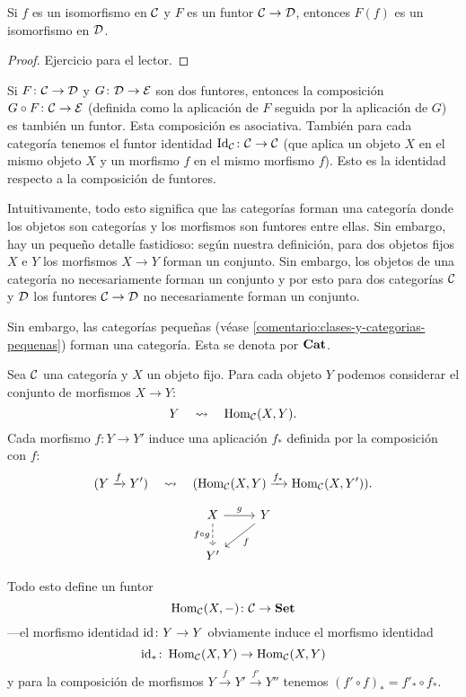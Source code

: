 \documentclass{article}
\numberwithin{equation}{section}
\theoremstyle{definition}
\begin{document}
\begin{observacion}
  Si $f$ es un isomorfismo en $\mathcal{C}$ y $F$ es un funtor
  $\mathcal{C}\to \mathcal{D}$, entonces $F (f)$ es un isomorfismo en
  $\mathcal{D}$.

  \begin{proof}
    Ejercicio para el lector.
  \end{proof}
\end{observacion}

\begin{observacion}
  Si $F\colon \mathcal{C}\to\mathcal{D}$ y $G\colon \mathcal{D}\to\mathcal{E}$ son
  dos funtores, entonces la composición
  $G\circ F\colon \mathcal{C} \to \mathcal{E}$ (definida como la aplicación de $F$
  seguida por la aplicación de $G$) es también un funtor. Esta composición es
  asociativa. También para cada categoría tenemos el funtor identidad
  $\operatorname{Id}_\mathcal{C}\colon \mathcal{C} \to \mathcal{C}$ (que aplica un objeto $X$ en
  el mismo objeto $X$ y un morfismo $f$ en el mismo morfismo $f$). Esto es la
  identidad respecto a la composición de funtores.
\end{observacion}

\begin{comentario}
  Intuitivamente, todo esto significa que las categorías forman una categoría
  donde los objetos son categorías y los morfismos son funtores entre ellas. Sin
  embargo, hay un pequeño detalle fastidioso: según nuestra definición, para dos
  objetos fijos $X$ e $Y$ los morfismos $X\to Y$ forman un conjunto. Sin
  embargo, los objetos de una categoría no necesariamente forman un conjunto y
  por esto para dos categorías $\mathcal{C}$ y $\mathcal{D}$ los funtores
  $\mathcal{C}\to\mathcal{D}$ no necesariamente forman un conjunto.

  Sin embargo, las categorías pequeñas (véase
  \ref{comentario:clases-y-categorias-pequenas}) forman una categoría. Esta se
  denota por $\text{\bf Cat}$.
\end{comentario}

\begin{ejemplo}
  \label{ejemplo:hom-covariante}
  Sea $\mathcal{C}$ una categoría y $X$ un objeto fijo. Para cada objeto $Y$
  podemos considerar el conjunto de morfismos $X\to Y$:
  $$Y \quad\rightsquigarrow\quad \operatorname{Hom}_\mathcal{C} (X,Y).$$
  Cada morfismo $f\colon Y\to Y'$ induce una aplicación $f_*$ definida por la
  composición con $f$:
  $$(Y\xrightarrow{f} Y') \quad\rightsquigarrow\quad (\operatorname{Hom}_\mathcal{C} (X,Y) \xrightarrow{f_*} \operatorname{Hom}_\mathcal{C} (X,Y')).$$

  \[ \begin{tikzcd}
      X\ar{r}{g}\ar[dashed]{d}[swap]{f\circ g} & Y\ar{dl}{f} \\
      Y'
    \end{tikzcd} \]

  Todo esto define un funtor
  $$\operatorname{Hom}_\mathcal{C} (X,-)\colon \mathcal{C} \to \text{\bf Set}$$
  ---el morfismo identidad $\mathrm{id}\colon Y\to Y$ obviamente induce el morfismo
  identidad
  $$\mathrm{id}_*\colon \operatorname{Hom}_\mathcal{C} (X,Y) \to \operatorname{Hom}_\mathcal{C} (X,Y)$$
  y para la composición de morfismos $Y \xrightarrow{f} Y' \xrightarrow{f'} Y''$
  tenemos $(f'\circ f)_* = f'_* \circ f_*$.
\end{ejemplo}
\end{document}
